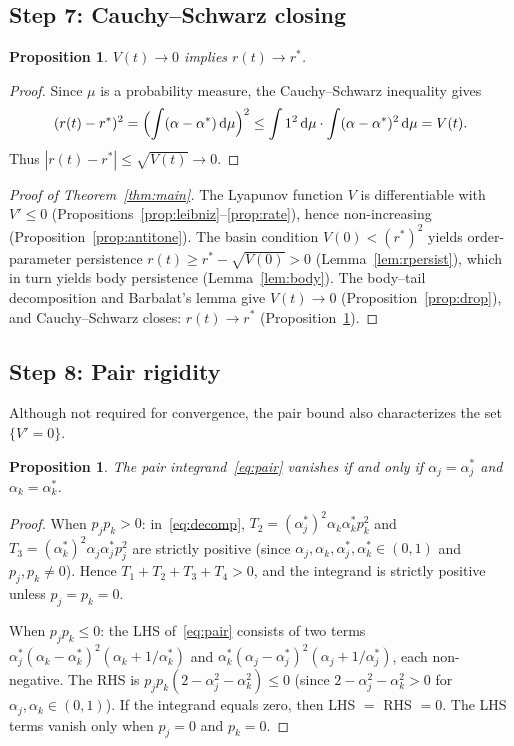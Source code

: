 \documentclass[11pt,a4paper]{article}
\newtheorem{proposition}[theorem]{Proposition}
\theoremstyle{definition}
\begin{document}
\subsection{Step 7: Cauchy--Schwarz closing}\label{sec:cauchy}

\begin{proposition}\label{prop:rconv}
$V(t)\to 0$ implies $r(t)\to r^*$.
\end{proposition}

\begin{proof}
Since $\mu$ is a probability measure, the Cauchy--Schwarz inequality gives
\[
(r(t)-r^*)^2 = \Bigl(\int(\alpha-\alpha^*)\,\mathrm{d}\mu\Bigr)^2 \leq \int 1^2\,\mathrm{d}\mu\cdot\int(\alpha-\alpha^*)^2\,\mathrm{d}\mu = V(t).
\]
Thus $|r(t)-r^*|\leq\sqrt{V(t)}\to 0$.
\end{proof}

\begin{proof}[Proof of Theorem~\ref{thm:main}]
The Lyapunov function $V$ is differentiable with $V'\leq 0$ (Propositions~\ref{prop:leibniz}--\ref{prop:rate}), hence non-increasing (Proposition~\ref{prop:antitone}). The basin condition $V(0)<(r^*)^2$ yields order-parameter persistence $r(t)\geq r^*-\sqrt{V(0)}>0$ (Lemma~\ref{lem:rpersist}), which in turn yields body persistence (Lemma~\ref{lem:body}). The body--tail decomposition and Barbalat's lemma give $V(t)\to 0$ (Proposition~\ref{prop:drop}), and Cauchy--Schwarz closes: $r(t)\to r^*$ (Proposition~\ref{prop:rconv}).
\end{proof}

\subsection{Step 8: Pair rigidity}\label{sec:rigidity}

Although not required for convergence, the pair bound also characterizes the set $\{V'=0\}$.

\begin{proposition}\label{prop:rigidity}
The pair integrand~\eqref{eq:pair} vanishes if and only if $\alpha_j=\alpha^*_j$ and $\alpha_k=\alpha^*_k$.
\end{proposition}

\begin{proof}
When $p_jp_k>0$: in~\eqref{eq:decomp}, $T_2=(\alpha^*_j)^2\alpha_k\alpha^*_kp_k^2$ and $T_3=(\alpha^*_k)^2\alpha_j\alpha^*_jp_j^2$ are strictly positive (since $\alpha_j,\alpha_k,\alpha^*_j,\alpha^*_k\in(0,1)$ and $p_j,p_k\neq 0$). Hence $T_1+T_2+T_3+T_4>0$, and the integrand is strictly positive unless $p_j=p_k=0$.

When $p_jp_k\leq 0$: the LHS of~\eqref{eq:pair} consists of two terms $\alpha^*_j(\alpha_k-\alpha^*_k)^2(\alpha_k+1/\alpha^*_k)$ and $\alpha^*_k(\alpha_j-\alpha^*_j)^2(\alpha_j+1/\alpha^*_j)$, each non-negative. The RHS is $p_jp_k(2-\alpha_j^2-\alpha_k^2)\leq 0$ (since $2-\alpha_j^2-\alpha_k^2>0$ for $\alpha_j,\alpha_k\in(0,1)$). If the integrand equals zero, then LHS $=$ RHS $=0$. The LHS terms vanish only when $p_j=0$ and $p_k=0$.
\end{proof}
\end{document}
